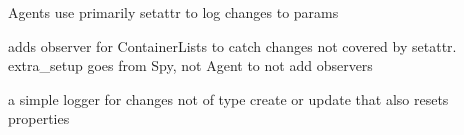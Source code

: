 \documentclass[letterpaper,10pt,english]{sphinxmanual}
\begin{document}
\begin{fulllineitems}
\label{core_doc/agent:taref.core.agent.Agent}
Agents use primarily setattr to log changes to params

\begin{fulllineitems}
\label{core_doc/agent:taref.core.agent.Agent.base_name}
\end{fulllineitems}


\begin{fulllineitems}
\label{core_doc/agent:taref.core.agent.Agent.extra_setup}
adds observer for ContainerLists to catch changes not covered by setattr.
extra\_setup goes from Spy, not Agent to not add observers

\end{fulllineitems}


\begin{fulllineitems}
\label{core_doc/agent:taref.core.agent.Agent.log_changes}
a simple logger for changes not of type create or update that also resets properties

\end{fulllineitems}


\end{fulllineitems}

\end{document}
